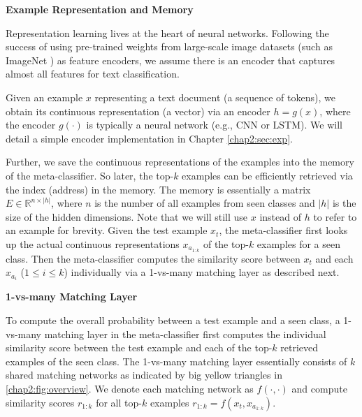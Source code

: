 \textbf{Example Representation and Memory}
\label{chap2:sec:mem}

Representation learning lives at the heart of neural networks. 
Following the success of using pre-trained weights from large-scale image datasets (such as ImageNet \cite{russakovsky2015imagenet}) as feature encoders, we assume there is an encoder that captures almost all features for text classification.

Given an example $x$ representing a text document (a sequence of tokens), we obtain its continuous representation (a vector) via an encoder $h=g(x)$, where the encoder $g(\cdot)$ is typically a neural network (e.g., CNN or LSTM).
We will detail a simple encoder implementation in Chapter \ref{chap2:sec:exp}.

Further, we save the continuous representations of the examples into the memory of the meta-classifier.
So later, the top-$k$ examples can be efficiently retrieved via the index (address) in the memory. 
The memory is essentially a matrix $E \in \mathbb{R} ^{n \times |h|}$, where $n$ is the number of all examples from seen classes and $|h|$ is the size of the hidden dimensions.
Note that we will still use $x$ instead of $h$ to refer to an example for brevity.
Given the test example $x_t$, the meta-classifier first looks up the actual continuous representations $x_{a_{1:k} }$ of the top-$k$ examples for a seen class.
Then the meta-classifier computes the similarity score between $x_t$ and each $x_{a_{i} }$ ($1\le i \le k$) individually via a 1-vs-many matching layer as described next. 

\textbf{1-vs-many Matching Layer}
\label{chap2:sec:1vsmany}

To compute the overall probability between a test example and a seen class, a 1-vs-many matching layer in the meta-classifier first computes the individual similarity score between the test example and each of the top-$k$ retrieved examples of the seen class. 
The 1-vs-many matching layer essentially consists of $k$ shared matching networks as indicated by big yellow triangles in \ref{chap2:fig:overview}.
We denote each matching network as $f(\cdot, \cdot)$ and compute similarity scores $r_{1:k}$ for all top-$k$ examples $r_{1:k}=f(x_t, x_{a_{1:k}} )$.

